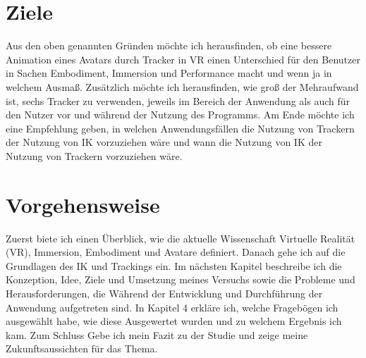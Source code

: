 \section{Ziele}
Aus den oben genannten Gründen möchte ich herausfinden, ob eine bessere Animation eines Avatars durch Tracker in VR einen Unterschied für den Benutzer in Sachen Embodiment, Immersion und Performance macht und wenn ja in welchem Ausmaß. 
Zusätzlich möchte ich herausfinden, wie groß der Mehraufwand ist, sechs Tracker zu verwenden, jeweils im Bereich der Anwendung als auch für den Nutzer vor und während der Nutzung des Programms.
Am Ende möchte ich eine Empfehlung geben, in welchen Anwendungsfällen die Nutzung von Trackern der Nutzung von IK vorzuziehen wäre und wann die Nutzung von IK der Nutzung von Trackern vorzuziehen wäre.


\section{Vorgehensweise}
Zuerst biete ich einen Überblick, wie die aktuelle Wissenschaft Virtuelle Realität (VR), Immersion, Embodiment und Avatare definiert. Danach gehe ich auf die Grundlagen des IK und Trackings ein. Im nächsten Kapitel beschreibe ich die Konzeption, Idee, Ziele und Umsetzung meines Versuchs sowie die Probleme und Herausforderungen, die Während der Entwicklung und Durchführung der Anwendung aufgetreten sind. In Kapitel 4 erkläre ich, welche Fragebögen ich ausgewählt habe, wie diese Ausgewertet wurden und zu welchem Ergebnis ich kam. Zum Schluss Gebe ich mein Fazit zu der Studie und zeige meine Zukunftsaussichten für das Thema.